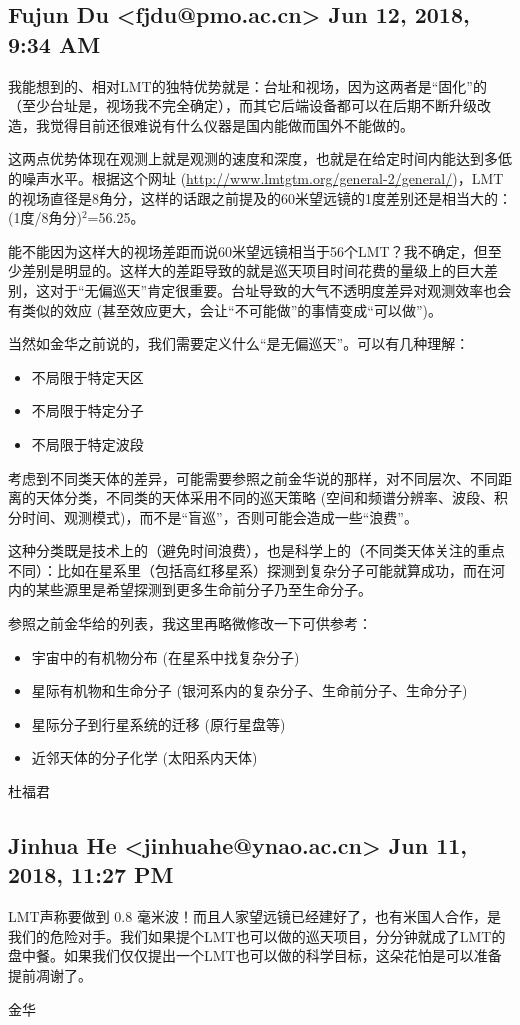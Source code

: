 \documentclass{article}
\newcommand\from[2]{\subsection{{#1} {#2}}}
\newcommand\said[1]{#1}
\begin{document}
\from{
Fujun Du <fjdu@pmo.ac.cn>
}{
Jun 12, 2018, 9:34 AM
}
\said{我能想到的、相对LMT的独特优势就是：台址和视场，因为这两者是“固化”的（至少台址是，视场我不完全确定），而其它后端设备都可以在后期不断升级改造，我觉得目前还很难说有什么仪器是国内能做而国外不能做的。

这两点优势体现在观测上就是观测的速度和深度，也就是在给定时间内能达到多低的噪声水平。根据这个网址 (\url{http://www.lmtgtm.org/general-2/general/})，LMT的视场直径是8角分，这样的话跟之前提及的60米望远镜的1度差别还是相当大的：(1度/8角分)$^2$=56.25。

能不能因为这样大的视场差距而说60米望远镜相当于56个LMT？我不确定，但至少差别是明显的。这样大的差距导致的就是巡天项目时间花费的量级上的巨大差别，这对于“无偏巡天”肯定很重要。台址导致的大气不透明度差异对观测效率也会有类似的效应 (甚至效应更大，会让“不可能做”的事情变成“可以做”)。

当然如金华之前说的，我们需要定义什么“是无偏巡天”。可以有几种理解：
\begin{itemize}
  \item 不局限于特定天区
  \item 不局限于特定分子
  \item 不局限于特定波段
\end{itemize}  

考虑到不同类天体的差异，可能需要参照之前金华说的那样，对不同层次、不同距离的天体分类，不同类的天体采用不同的巡天策略 (空间和频谱分辨率、波段、积分时间、观测模式)，而不是“盲巡”，否则可能会造成一些“浪费”。

这种分类既是技术上的（避免时间浪费），也是科学上的（不同类天体关注的重点不同）：比如在星系里（包括高红移星系）探测到复杂分子可能就算成功，而在河内的某些源里是希望探测到更多生命前分子乃至生命分子。

参照之前金华给的列表，我这里再略微修改一下可供参考：
\begin{itemize}
  \item 宇宙中的有机物分布 (在星系中找复杂分子)
  \item 星际有机物和生命分子 (银河系内的复杂分子、生命前分子、生命分子)
  \item 星际分子到行星系统的迁移 (原行星盘等)
  \item 近邻天体的分子化学 (太阳系内天体)
\end{itemize}  

杜福君
}


\from{
Jinhua He <jinhuahe@ynao.ac.cn>
}{
Jun 11, 2018, 11:27 PM
}
\said{
LMT声称要做到 0.8 毫米波！而且人家望远镜已经建好了，也有米国人合作，是我们的危险对手。我们如果提个LMT也可以做的巡天项目，分分钟就成了LMT的盘中餐。如果我们仅仅提出一个LMT也可以做的科学目标，这朵花怕是可以准备提前凋谢了。

金华}
\end{document}
